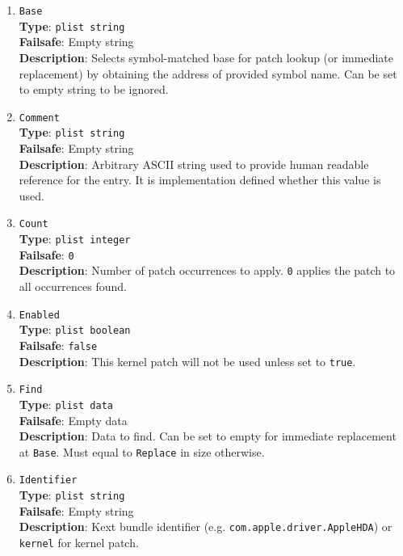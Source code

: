 \documentclass[]{article}
\begin{document}
\begin{enumerate}
\item
  \texttt{Base}\\
  \textbf{Type}: \texttt{plist\ string}\\
  \textbf{Failsafe}: Empty string\\
  \textbf{Description}: Selects symbol-matched base for patch lookup (or immediate
  replacement) by obtaining the address of provided symbol name. Can be set to
  empty string to be ignored.

\item
  \texttt{Comment}\\
  \textbf{Type}: \texttt{plist\ string}\\
  \textbf{Failsafe}: Empty string\\
  \textbf{Description}: Arbitrary ASCII string used to provide human readable
  reference for the entry. It is implementation defined whether this value is
  used.

\item
  \texttt{Count}\\
  \textbf{Type}: \texttt{plist\ integer}\\
  \textbf{Failsafe}: \texttt{0}\\
  \textbf{Description}: Number of patch occurrences to apply. \texttt{0} applies
  the patch to all occurrences found.

\item
  \texttt{Enabled}\\
  \textbf{Type}: \texttt{plist\ boolean}\\
  \textbf{Failsafe}: \texttt{false}\\
  \textbf{Description}: This kernel patch will not be used unless set to
  \texttt{true}.

\item
  \texttt{Find}\\
  \textbf{Type}: \texttt{plist\ data}\\
  \textbf{Failsafe}: Empty data\\
  \textbf{Description}: Data to find. Can be set to empty for immediate
  replacement at \texttt{Base}. Must equal to \texttt{Replace} in size
  otherwise.

\item
  \texttt{Identifier}\\
  \textbf{Type}: \texttt{plist\ string}\\
  \textbf{Failsafe}: Empty string\\
  \textbf{Description}: Kext bundle identifier (e.g. \texttt{com.apple.driver.AppleHDA})
  or \texttt{kernel} for kernel patch.


\end{enumerate}
\end{document}
